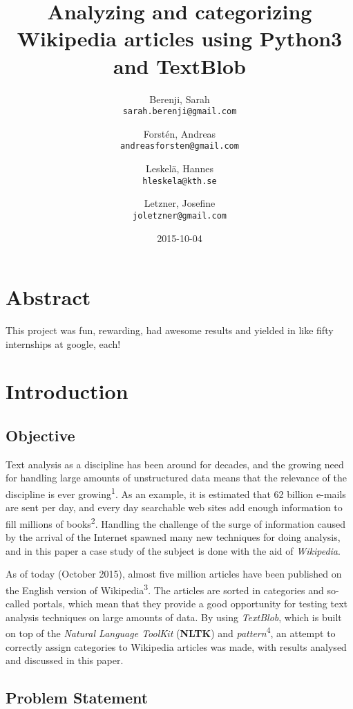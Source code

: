 \documentclass[a4paper]{article}
\title{Analyzing and categorizing Wikipedia articles using Python3 and TextBlob}
\author{
  Berenji, Sarah\\
  \texttt{sarah.berenji@gmail.com}
  \and
  Forstén, Andreas\\
  \texttt{andreasforsten@gmail.com}
  \and
  Leskelä, Hannes\\
  \texttt{hleskela@kth.se}
  \and
  Letzner, Josefine\\
    \texttt{joletzner@gmail.com}
}
\date{2015-10-04}
\begin{document}
\maketitle
\section*{Abstract}
This project was fun, rewarding, had awesome results and yielded in like fifty internships at google, each!
\newpage
\tableofcontents
\newpage

\section*{Introduction}


\vspace{3mm}

\subsection*{Objective}

Text analysis as a discipline has been around for decades, and the growing need for handling large amounts of unstructured data means that the relevance of the discipline is ever growing\textsuperscript{1}. As an example, it is estimated that 62 billion e-mails are sent per day, and every day searchable web sites add enough information to fill millions of books\textsuperscript{2}.  Handling the challenge of the surge of information caused by the arrival of the Internet spawned many new techniques for doing analysis, and in this paper a case study of the subject is done with the aid of \textit{Wikipedia}. 

\vspace{3mm}

As of today (October 2015), almost five million articles have been published on the English version of Wikipedia\textsuperscript{3}. The articles are sorted in categories and so-called portals, which mean that they provide a good opportunity for testing text analysis techniques on large amounts of data. By using \textit{TextBlob}, which is built on top of the \textit{Natural Language ToolKit} (\textbf{NLTK}) and \textit{pattern}\textsuperscript{4}, an attempt to correctly assign categories to Wikipedia articles was made, with results analysed and discussed in this paper. 

\vspace{3mm}

\subsection*{Problem Statement}
\end{document}

